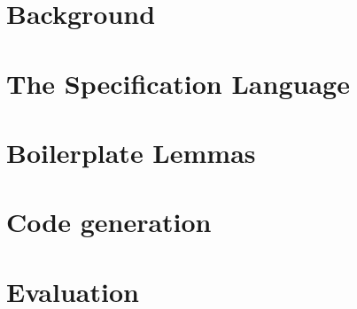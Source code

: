 
\chapter{Background}\label{ch:gen:background}



\chapter{The \Knot Specification Language}\label{ch:knotsyntax}



\chapter{Boilerplate Lemmas}\label{ch:elaboration}




\chapter{Code generation}\label{ch:codegen}


\chapter{Evaluation}





